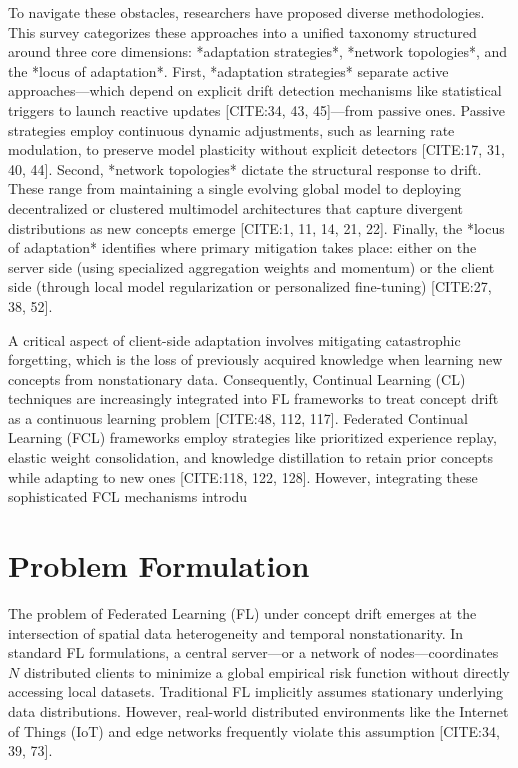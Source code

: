 \documentclass[journal]{IEEEtran}
\begin{document}
To navigate these obstacles, researchers have proposed diverse methodologies. This survey categorizes these approaches into a unified taxonomy structured around three core dimensions: *adaptation strategies*, *network topologies*, and the *locus of adaptation*. First, *adaptation strategies* separate active approaches—which depend on explicit drift detection mechanisms like statistical triggers to launch reactive updates [CITE:34, 43, 45]—from passive ones. Passive strategies employ continuous dynamic adjustments, such as learning rate modulation, to preserve model plasticity without explicit detectors [CITE:17, 31, 40, 44]. Second, *network topologies* dictate the structural response to drift. These range from maintaining a single evolving global model to deploying decentralized or clustered multimodel architectures that capture divergent distributions as new concepts emerge [CITE:1, 11, 14, 21, 22]. Finally, the *locus of adaptation* identifies where primary mitigation takes place: either on the server side (using specialized aggregation weights and momentum) or the client side (through local model regularization or personalized fine-tuning) [CITE:27, 38, 52].

A critical aspect of client-side adaptation involves mitigating catastrophic forgetting, which is the loss of previously acquired knowledge when learning new concepts from nonstationary data. Consequently, Continual Learning (CL) techniques are increasingly integrated into FL frameworks to treat concept drift as a continuous learning problem [CITE:48, 112, 117]. Federated Continual Learning (FCL) frameworks employ strategies like prioritized experience replay, elastic weight consolidation, and knowledge distillation to retain prior concepts while adapting to new ones [CITE:118, 122, 128]. However, integrating these sophisticated FCL mechanisms introdu

\section{Problem Formulation}
\label{sec:problem_formulation}

The problem of Federated Learning (FL) under concept drift emerges at the intersection of spatial data heterogeneity and temporal nonstationarity. In standard FL formulations, a central server—or a network of nodes—coordinates $N$ distributed clients to minimize a global empirical risk function without directly accessing local datasets. Traditional FL implicitly assumes stationary underlying data distributions. However, real-world distributed environments like the Internet of Things (IoT) and edge networks frequently violate this assumption [CITE:34, 39, 73]. 
\end{document}
